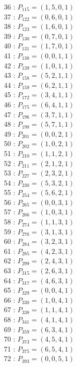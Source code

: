 \documentclass{article}
\begin{document}
{\begin{multicols}{3}
36 : $P_{115}=( 1, 5, 0, 1 )$\\
37 : $P_{122}=( 0, 6, 0, 1 )$\\
38 : $P_{123}=( 1, 6, 0, 1 )$\\
39 : $P_{130}=( 0, 7, 0, 1 )$\\
40 : $P_{131}=( 1, 7, 0, 1 )$\\
41 : $P_{138}=( 0, 0, 1, 1 )$\\
42 : $P_{139}=( 1, 0, 1, 1 )$\\
43 : $P_{158}=( 5, 2, 1, 1 )$\\
44 : $P_{159}=( 6, 2, 1, 1 )$\\
45 : $P_{172}=( 3, 4, 1, 1 )$\\
46 : $P_{175}=( 6, 4, 1, 1 )$\\
47 : $P_{196}=( 3, 7, 1, 1 )$\\
48 : $P_{198}=( 5, 7, 1, 1 )$\\
49 : $P_{201}=( 0, 0, 2, 1 )$\\
50 : $P_{202}=( 1, 0, 2, 1 )$\\
51 : $P_{210}=( 1, 1, 2, 1 )$\\
52 : $P_{211}=( 2, 1, 2, 1 )$\\
53 : $P_{227}=( 2, 3, 2, 1 )$\\
54 : $P_{230}=( 5, 3, 2, 1 )$\\
55 : $P_{254}=( 5, 6, 2, 1 )$\\
56 : $P_{265}=( 0, 0, 3, 1 )$\\
57 : $P_{266}=( 1, 0, 3, 1 )$\\
58 : $P_{274}=( 1, 1, 3, 1 )$\\
59 : $P_{276}=( 3, 1, 3, 1 )$\\
60 : $P_{284}=( 3, 2, 3, 1 )$\\
61 : $P_{285}=( 4, 2, 3, 1 )$\\
62 : $P_{299}=( 2, 4, 3, 1 )$\\
63 : $P_{315}=( 2, 6, 3, 1 )$\\
64 : $P_{317}=( 4, 6, 3, 1 )$\\
65 : $P_{329}=( 0, 0, 4, 1 )$\\
66 : $P_{330}=( 1, 0, 4, 1 )$\\
67 : $P_{338}=( 1, 1, 4, 1 )$\\
68 : $P_{341}=( 4, 1, 4, 1 )$\\
69 : $P_{359}=( 6, 3, 4, 1 )$\\
70 : $P_{373}=( 4, 5, 4, 1 )$\\
71 : $P_{375}=( 6, 5, 4, 1 )$\\
72 : $P_{393}=( 0, 0, 5, 1 )$\\

\end{multicols}}
\end{document}
